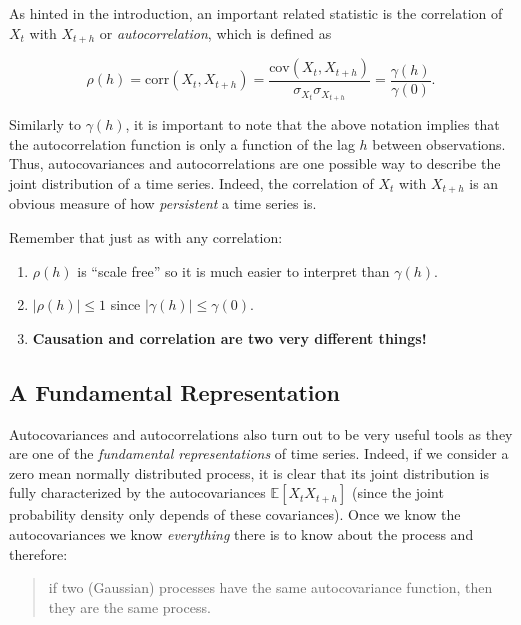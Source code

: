 \documentclass[]{book}
\providecommand{\tightlist}{%
  \setlength{\itemsep}{0pt}\setlength{\parskip}{0pt}}
\theoremstyle{definition}
\theoremstyle{definition}
\theoremstyle{definition}
\theoremstyle{remark}
\begin{document}
As hinted in the introduction, an important related statistic is the
correlation of \(X_t\) with \(X_{t+h}\) or \emph{autocorrelation}, which
is defined as

\[\rho \left(  h \right) = \text{corr}\left( {{X_t},{X_{t + h}}} \right) = \frac{{\text{cov}\left( {{X_t},{X_{t + h}}} \right)}}{{{\sigma _{{X_t}}}{\sigma _{{X_{t + h}}}}}} = \frac{\gamma(h) }{\gamma(0)}.\]

Similarly to \(\gamma(h)\), it is important to note that the above
notation implies that the autocorrelation function is only a function of
the lag \(h\) between observations. Thus, autocovariances and
autocorrelations are one possible way to describe the joint distribution
of a time series. Indeed, the correlation of \(X_t\) with \(X_{t+h}\) is
an obvious measure of how \emph{persistent} a time series is.

Remember that just as with any correlation:

\begin{enumerate}
\def\labelenumi{\arabic{enumi}.}
\tightlist
\item
  \(\rho \left( h \right)\) is ``scale free'' so it is much easier to
  interpret than \(\gamma(h)\).
\item
  \(|\rho \left( h \right)| \leq 1\) since
  \(|\gamma(h)| \leq \gamma(0)\).
\item
  \textbf{Causation and correlation are two very different things!}
\end{enumerate}

\subsection{A Fundamental
Representation}\label{a-fundamental-representation}

Autocovariances and autocorrelations also turn out to be very useful
tools as they are one of the \emph{fundamental representations} of time
series. Indeed, if we consider a zero mean normally distributed process,
it is clear that its joint distribution is fully characterized by the
autocovariances \(\mathbb{E}[X_t X_{t+h}]\) (since the joint probability
density only depends of these covariances). Once we know the
autocovariances we know \emph{everything} there is to know about the
process and therefore:

\begin{quote}
if two (Gaussian) processes have the same autocovariance function, then
they are the same process.
\end{quote}
\end{document}
